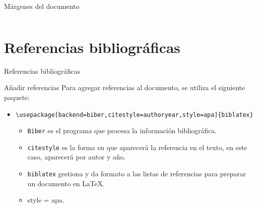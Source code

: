 \documentclass[aspectratio=169, 10pt]{beamer}
\begin{document}
\begin{frame}[fragile]{Márgenes del documento}
\begin{columns}
\begin{column}{.55\linewidth}
\end{column}
\end{columns}


\end{frame}



\section{Referencias bibliográficas}
\begin{frame}[fragile]{Referencias bibliográficas} \pause

    \begin{alertblock}{Añadir referencias} \pause
                Para agregar referencias al documento, se utiliza el siguiente paquete: \pause
    \begin{itemize}
        \item \verb|\usepackage[backend=biber,citestyle=authoryear,style=apa]{biblatex}| \pause
        \begin{itemize} \pause
            \item \verb|Biber| es el programa que procesa la información bibliográfica. \pause
            \item \verb|citestyle| es la forma en que aparecerá la referencia en el texto, en este caso, aparecerá por autor y año. \pause
            \item \verb|biblatex| gestiona y da formato a las listas de referencias para preparar un documento en \LaTeX. \pause
            \item style = apa.
        \end{itemize}
    \end{itemize}

        
        
    \end{alertblock}
    
\end{frame}
\end{document}
